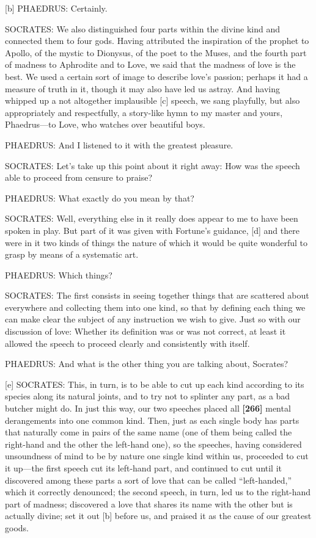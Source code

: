 {[}b{]} PHAEDRUS: Certainly.

SOCRATES: We also distinguished four parts within the divine kind and
connected them to four gods. Having attributed the inspiration of the
prophet to Apollo, of the mystic to Dionysus, of the poet to the Muses,
and the fourth part of madness to Aphrodite and to Love, we said that
the madness of love is the best. We used a certain sort of image to
describe love's passion; perhaps it had a measure of truth in it, though
it may also have led us astray. And having whipped up a not altogether
implausible {[}c{]} speech, we sang playfully, but also appropriately
and respectfully, a story-like hymn to my master and yours,
Phaedrus---to Love, who watches over beautiful boys.

PHAEDRUS: And I listened to it with the greatest pleasure.

SOCRATES: Let's take up this point about it right away: How was the
speech able to proceed from censure to praise?

PHAEDRUS: What exactly do you mean by that?

SOCRATES: Well, everything else in it really does appear to me to have
been spoken in play. But part of it was given with Fortune's guidance,
{[}d{]} and there were in it two kinds of things the nature of which it
would be quite wonderful to grasp by means of a systematic art.

PHAEDRUS: Which things?

SOCRATES: The first consists in seeing together things that are
scattered about everywhere and collecting them into one kind, so that by
defining each thing we can make clear the subject of any instruction we
wish to give. Just so with our discussion of love: Whether its
definition was or was not correct, at least it allowed the speech to
proceed clearly and consistently with itself.

PHAEDRUS: And what is the other thing you are talking about, Socrates?

{[}e{]} SOCRATES: This, in turn, is to be able to cut up each kind
according to its species along its natural joints, and to try not to
splinter any part, as a bad butcher might do. In just this way, our two
speeches placed all {\bf {[}266{]}} mental derangements into one common
kind. Then, just as each single body has parts that naturally come in
pairs of the same name (one of them being called the right-hand and the
other the left-hand one), so the speeches, having considered unsoundness
of mind to be by nature one single kind within us, proceeded to cut it
up---the first speech cut its left-hand part, and continued to cut until
it discovered among these parts a sort of love that can be called
“left-handed,” which it correctly denounced; the second speech, in turn,
led us to the right-hand part of madness; discovered a love that shares
its name with the other but is actually divine; set it out {[}b{]}
before us, and praised it as the cause of our greatest goods.

